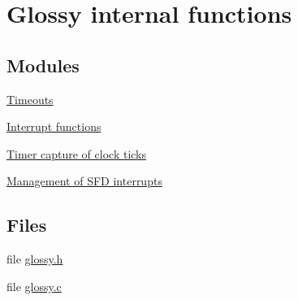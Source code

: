 \hypertarget{group__glossy__internal}{
\section{Glossy internal functions}
\label{group__glossy__internal}
}
\subsection*{Modules}
\begin{DoxyCompactItemize}
\item 
\hyperlink{group__glossy__timeouts}{Timeouts}
\item 
\hyperlink{group__glossy__interrupts}{Interrupt functions}
\item 
\hyperlink{group__glossy__capture}{Timer capture of clock ticks}
\item 
\hyperlink{group__glossy__sfd}{Management of SFD interrupts}
\end{DoxyCompactItemize}
\subsection*{Files}
\begin{DoxyCompactItemize}
\item 
file \hyperlink{glossy_8h}{glossy.h}
\item 
file \hyperlink{glossy_8c}{glossy.c}
\end{DoxyCompactItemize}
